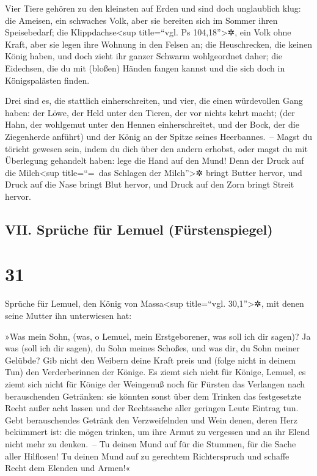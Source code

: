 Vier Tiere gehören zu den kleinsten auf Erden und sind
doch unglaublich klug: die Ameisen, ein schwaches Volk,
aber sie bereiten sich im Sommer ihren Speisebedarf; die
Klippdachse\textless sup title=``vgl. Ps 104,18''\textgreater✲, ein Volk
ohne Kraft, aber sie legen ihre Wohnung in den Felsen an;
die Heuschrecken, die keinen König haben, und doch zieht
ihr ganzer Schwarm wohlgeordnet daher; die Eidechsen, die
du mit (bloßen) Händen fangen kannst und die sich doch in Königspalästen
finden.

Drei sind es, die stattlich einherschreiten, und vier,
die einen würdevollen Gang haben: der Löwe, der Held
unter den Tieren, der vor nichts kehrt macht; (der Hahn,
der wohlgemut unter den Hennen einherschreitet, und der Bock, der die
Ziegenherde anführt) und der König an der Spitze seines Heerbannes.~--
Magst du töricht gewesen sein, indem du dich über den
andern erhobst, oder magst du mit Überlegung gehandelt haben: lege die
Hand auf den Mund! Denn der Druck auf die
Milch\textless sup title=``=~das Schlagen der Milch''\textgreater✲
bringt Butter hervor, und Druck auf die Nase bringt Blut hervor, und
Druck auf den Zorn bringt Streit hervor.

\hypertarget{vii.-spruxfcche-fuxfcr-lemuel-fuxfcrstenspiegel}{%
\subsection{VII. Sprüche für Lemuel
(Fürstenspiegel)}\label{vii.-spruxfcche-fuxfcr-lemuel-fuxfcrstenspiegel}}

\hypertarget{section-30}{%
\section{31}\label{section-30}}

Sprüche für Lemuel, den König von Massa\textless sup
title=``vgl. 30,1''\textgreater✲, mit denen seine Mutter ihn unterwiesen
hat:

»Was mein Sohn, (was, o Lemuel, mein Erstgeborener, was
soll ich dir sagen)? Ja was (soll ich dir sagen), du Sohn meines
Schoßes, und was dir, du Sohn meiner Gelübde? Gib nicht
den Weibern deine Kraft preis und (folge nicht in deinem Tun) den
Verderberinnen der Könige. Es ziemt sich nicht für Könige,
Lemuel, es ziemt sich nicht für Könige der Weingenuß noch für Fürsten
das Verlangen nach berauschenden Getränken: sie könnten
sonst über dem Trinken das festgesetzte Recht außer acht lassen und der
Rechtssache aller geringen Leute Eintrag tun. Gebt
berauschendes Getränk den Verzweifelnden und Wein denen, deren Herz
bekümmert ist: die mögen trinken, um ihre Armut zu
vergessen und an ihr Elend nicht mehr zu denken.~-- Tu
deinen Mund auf für die Stummen, für die Sache aller Hilflosen!
Tu deinen Mund auf zu gerechtem Richterspruch und schaffe
Recht dem Elenden und Armen!«

